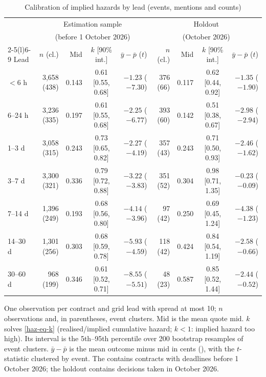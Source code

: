 \begin{table}[t]
\centering
\begin{threeparttable}
\caption{Calibration of implied hazards by lead (events, mentions and counts)}\label{haz-tab-calib}
\footnotesize
\setlength{\tabcolsep}{3.5pt}
\begin{tabular}{@{}lrrcrrrcr@{}}
\toprule
 & \multicolumn{4}{c}{Estimation sample} & \multicolumn{4}{c}{Holdout} \\
 & \multicolumn{4}{c}{(before 1 October 2026)} & \multicolumn{4}{c}{(October 2026)} \\
\cmidrule(lr){2-5}\cmidrule(l){6-9}
Lead & $n$ (cl.) & Mid & $k$ [90\% int.] & $\bar y-\bar p$ ($t$) & $n$ (cl.) & Mid & $k$ [90\% int.] & $\bar y-\bar p$ ($t$) \\
\midrule
$<6$ h   & 3{,}658 (438) & 0.143 & 0.61 [0.55, 0.68] & $-1.23$ ($-7.30$) & 376 (66) & 0.117 & 0.62 [0.44, 0.92] & $-1.35$ ($-1.90$) \\
6--24 h  & 3{,}236 (335) & 0.197 & 0.61 [0.55, 0.68] & $-2.25$ ($-6.77$) & 393 (60) & 0.142 & 0.51 [0.38, 0.67] & $-2.98$ ($-2.94$) \\
1--3 d   & 3{,}058 (315) & 0.243 & 0.73 [0.65, 0.82] & $-2.27$ ($-4.19$) & 357 (43) & 0.243 & 0.71 [0.50, 0.93] & $-2.46$ ($-1.62$) \\
3--7 d   & 3{,}300 (321) & 0.336 & 0.79 [0.72, 0.88] & $-3.22$ ($-3.83$) & 351 (52) & 0.304 & 0.98 [0.71, 1.35] & $-0.23$ ($-0.09$) \\
7--14 d  & 1{,}396 (249) & 0.193 & 0.68 [0.56, 0.80] & $-4.14$ ($-3.96$) &  97 (42) & 0.250 & 0.69 [0.45, 1.24] & $-4.38$ ($-1.23$) \\
14--30 d & 1{,}301 (256) & 0.303 & 0.68 [0.59, 0.78] & $-5.93$ ($-4.59$) & 118 (42) & 0.424 & 0.84 [0.54, 1.19] & $-2.58$ ($-0.66$) \\
30--60 d &    968 (199) & 0.346 & 0.61 [0.52, 0.71] & $-8.55$ ($-5.51$) &  48 (23) & 0.587 & 0.85 [0.52, 1.44] & $-2.44$ ($-0.52$) \\
\bottomrule
\end{tabular}
\begin{tablenotes}\footnotesize
\item One observation per contract and grid lead with spread at most 10\textcent; $n$ observations
and, in parentheses, event clusters. Mid is the mean quote mid. $k$ solves \cref{haz-eq-k}
(realised/implied cumulative hazard; $k<1$: implied hazard too high). Its interval is the 5th--95th
percentile over 200 bootstrap resamples of event clusters. $\bar y-\bar p$ is the mean outcome minus
mid in cents (\textcent), with the $t$-statistic clustered by event. The \estim{} contains contracts with
deadlines before 1 October 2026; the holdout contains decisions taken in October 2026.
\end{tablenotes}
\end{threeparttable}
\end{table}

